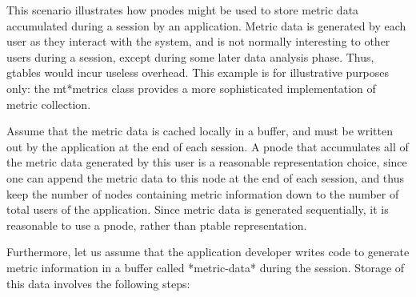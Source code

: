 This scenario illustrates how pnodes might be used to store metric data
accumulated during a session by an application.  Metric data is generated
by each user as they interact with the system, and is not normally
interesting to other users during a session, except during some later data
analysis phase. Thus, gtables would incur useless overhead.   This example
is for illustrative purposes only: the mt*metrics class provides a more
sophisticated implementation of metric collection.

Assume that the metric data is cached locally in a buffer, and must be
written out by the application at the end of each session. A pnode that
accumulates all of the metric data generated by this user is a reasonable
representation choice, since one can append the metric data to this node at
the end of each session, and thus keep the number of nodes containing
metric information down to the number of total users of the application.  
Since metric data is generated sequentially, it is reasonable to use a 
pnode, rather than ptable representation.  

Furthermore, let us assume that the application developer writes code to
generate metric information in a buffer called *metric-data* during the
session. 
Storage of this data involves the following steps:


